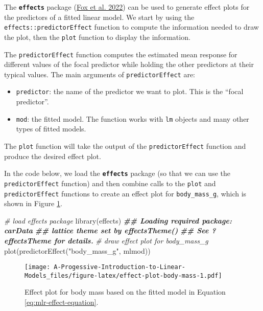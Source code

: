 \documentclass[
]{book}
\newenvironment{Shaded}{\begin{snugshade}}{\end{snugshade}}
\newcommand{\CommentTok}[1]{\textcolor[rgb]{0.56,0.35,0.01}{\textit{#1}}}
\newcommand{\DocumentationTok}[1]{\textcolor[rgb]{0.56,0.35,0.01}{\textbf{\textit{#1}}}}
\newcommand{\FunctionTok}[1]{\textcolor[rgb]{0.00,0.00,0.00}{#1}}
\newcommand{\NormalTok}[1]{#1}
\newcommand{\StringTok}[1]{\textcolor[rgb]{0.31,0.60,0.02}{#1}}
\providecommand{\tightlist}{%
  \setlength{\itemsep}{0pt}\setlength{\parskip}{0pt}}
\theoremstyle{definition}
\theoremstyle{definition}
\theoremstyle{definition}
\theoremstyle{definition}
\theoremstyle{remark}
\begin{document}
The \textbf{\texttt{effects}} package (\protect\hyperlink{ref-R-effects}{Fox et al. 2022}) can be used to generate effect
plots for the predictors of a fitted linear model. We start by using the
\texttt{effects::predictorEffect} function to compute the information needed to
draw the plot, then the \texttt{plot} function to display the information.

The \texttt{predictorEffect} function computes the estimated mean response for
different values of the focal predictor while holding the other
predictors at their typical values. The main arguments of
\texttt{predictorEffect} are:

\begin{itemize}
\tightlist
\item
  \texttt{predictor}: the name of the predictor we want to plot. This is the
  ``focal predictor''.
\item
  \texttt{mod}: the fitted model. The function works with \texttt{lm} objects and many other types of fitted models.
\end{itemize}

The \texttt{plot} function will take the output of the \texttt{predictorEffect}
function and produce the desired effect plot.

In the code below, we load the \textbf{\texttt{effects}} package (so that we can use
the \texttt{predictorEffect} function) and then combine calls to the \texttt{plot} and
\texttt{predictorEffect} functions to create an effect plot for \texttt{body\_mass\_g},
which is shown in Figure \ref{fig:effect-plot-body-mass}.

\begin{Shaded}
\begin{Highlighting}[]
\CommentTok{\# load effects package}
\FunctionTok{library}\NormalTok{(effects)}
\DocumentationTok{\#\# Loading required package: carData}
\DocumentationTok{\#\# lattice theme set by effectsTheme()}
\DocumentationTok{\#\# See ?effectsTheme for details.}
\CommentTok{\# draw effect plot for body\_mass\_g}
\FunctionTok{plot}\NormalTok{(}\FunctionTok{predictorEffect}\NormalTok{(}\StringTok{"body\_mass\_g"}\NormalTok{, mlmod))}
\end{Highlighting}
\end{Shaded}

\begin{figure}
\centering
\texttt{[image: A-Progessive-Introduction-to-Linear-Models\_files/figure-latex/effect-plot-body-mass-1.pdf]}
\caption{\label{fig:effect-plot-body-mass}Effect plot for body mass based on the fitted model in Equation \eqref{eq:mlr-effect-equation}.}
\end{figure}
\end{document}
